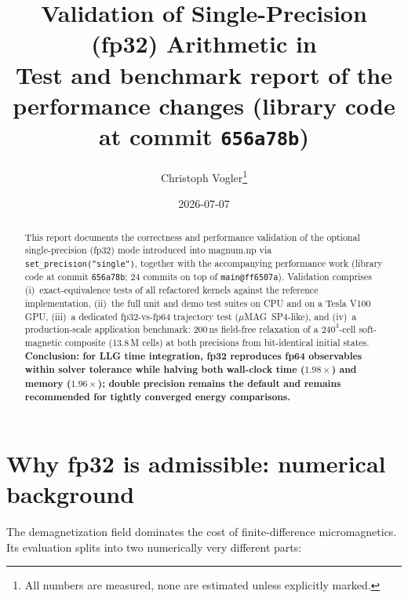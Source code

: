 \documentclass[11pt,a4paper]{article}
\title{Validation of Single-Precision (fp32) Arithmetic in \magnumnp{}\\
\large Test and benchmark report of the performance changes (library code at commit \texttt{656a78b})}
\author{Christoph Vogler\thanks{All numbers are measured, none are estimated unless explicitly marked.}}
\date{2026-07-07}
\newcommand{\magnumnp}{magnum.np}
\begin{document}
\maketitle

\begin{abstract}
This report documents the correctness and performance validation of the optional
single-precision (fp32) mode introduced into \magnumnp{} via
\texttt{set\_precision("single")}, together with the accompanying performance work
(library code at commit \texttt{656a78b}; 24 commits on top of
\texttt{main@ff6507a}). Validation comprises (i)~exact-equivalence tests of all
refactored kernels against the reference implementation, (ii)~the full unit and
demo test suites on CPU and on a Tesla V100 GPU, (iii)~a dedicated
fp32-vs-fp64 trajectory test ($\mu$MAG~SP4-like), and (iv)~a production-scale
application benchmark: 200\,ns field-free relaxation of a $240^3$-cell
soft-magnetic composite (13.8\,M cells) at both precisions from bit-identical
initial states. \textbf{Conclusion: for LLG time integration, fp32 reproduces
fp64 observables within solver tolerance while halving both wall-clock time
($1.98\times$) and memory ($1.96\times$); double precision remains the default
and remains recommended for tightly converged energy comparisons.}
\end{abstract}

\tableofcontents

\section{Why fp32 is admissible: numerical background}
\label{sec:background}

The demagnetization field dominates the cost of finite-difference micromagnetics.
Its evaluation splits into two numerically very different parts:
\end{document}
